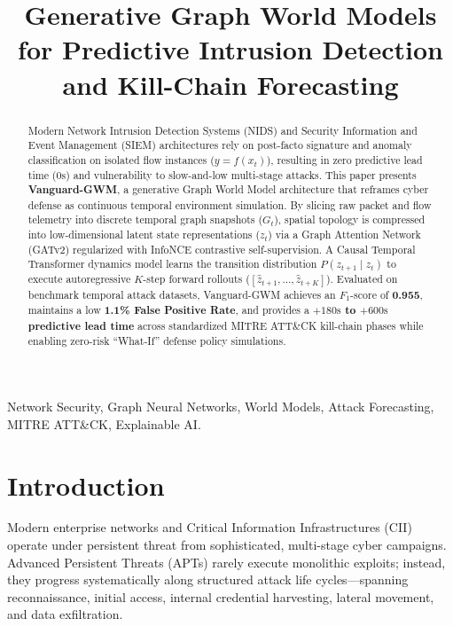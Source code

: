 \documentclass[conference]{IEEEtran}
\begin{document}
\title{Generative Graph World Models for Predictive Intrusion Detection and Kill-Chain Forecasting}

\author{
}

\maketitle

\begin{abstract}
Modern Network Intrusion Detection Systems (NIDS) and Security Information and Event Management (SIEM) architectures rely on post-facto signature and anomaly classification on isolated flow instances ($y = f(x_t)$), resulting in zero predictive lead time ($0\text{s}$) and vulnerability to slow-and-low multi-stage attacks. This paper presents \textbf{Vanguard-GWM}, a generative Graph World Model architecture that reframes cyber defense as continuous temporal environment simulation. By slicing raw packet and flow telemetry into discrete temporal graph snapshots ($G_t$), spatial topology is compressed into low-dimensional latent state representations ($z_t$) via a Graph Attention Network (GATv2) regularized with InfoNCE contrastive self-supervision. A Causal Temporal Transformer dynamics model learns the transition distribution $P(z_{t+1} \mid z_t)$ to execute autoregressive $K$-step forward rollouts ($[\hat{z}_{t+1}, \dots, \hat{z}_{t+K}]$). Evaluated on benchmark temporal attack datasets, Vanguard-GWM achieves an $F_1$-score of \textbf{0.955}, maintains a low \textbf{1.1\% False Positive Rate}, and provides a \textbf{$+180\text{s}$ to $+600\text{s}$ predictive lead time} across standardized MITRE ATT\&CK kill-chain phases while enabling zero-risk ``What-If'' defense policy simulations.
\end{abstract}

\begin{IEEEkeywords}
Network Security, Graph Neural Networks, World Models, Attack Forecasting, MITRE ATT\&CK, Explainable AI.
\end{IEEEkeywords}

\section{Introduction}
Modern enterprise networks and Critical Information Infrastructures (CII) operate under persistent threat from sophisticated, multi-stage cyber campaigns. Advanced Persistent Threats (APTs) rarely execute monolithic exploits; instead, they progress systematically along structured attack life cycles---spanning reconnaissance, initial access, internal credential harvesting, lateral movement, and data exfiltration.
\end{document}
